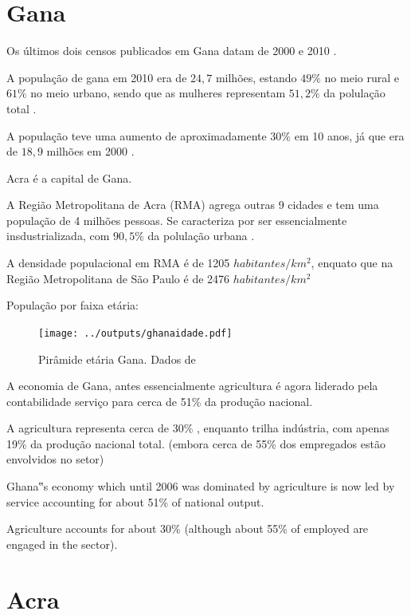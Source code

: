 \section{Gana}

Os últimos dois censos publicados em Gana datam
de 2000 \cite{censu2003} e 2010 \cite{censu2013}.

A população de gana em 2010 era de $24,7$ milhões, 
estando $49\%$ no meio rural e $61\%$ no meio urbano, 
sendo que as mulheres representam $51,2\%$ da polulação
total \cite{censu2013}.  

A população teve uma aumento de aproximadamente 
$30\%$ em 10 anos, já que era de $18,9$ milhões 
em 2000 \cite{censu2003}.

Acra é a capital de Gana. 

A Região Metropolitana de Acra (RMA) agrega outras 9 cidades
e tem uma população de 4 milhões pessoas. Se caracteriza por 
ser essencialmente insdustrializada, com $90,5 \%$ 
da polulação urbana \cite{censu2013}.  

A densidade populacional em RMA é de 1205 $habitantes/km^2$, 
enquato que na Região Metropolitana de São Paulo é de 
2476 $habitantes/km^2$ \cite{ibge2011}

População por faixa etária:  

\begin{figure}[H]
\begin{center}
  \texttt{[image: ../outputs/ghanaidade.pdf]}
  \caption{Pirâmide etária Gana. Dados de \cite{censu2013}}
\end{center}
\end{figure}

A economia de Gana, antes essencialmente agricultura é agora liderado pela contabilidade serviço para cerca de 51\% da produção nacional. 

A agricultura representa cerca de 30\% , enquanto trilha indústria, com apenas 19\% da produção nacional total. (embora cerca de 55\% dos empregados estão envolvidos no setor)

Ghana‟s economy which until 2006 was dominated by agriculture is now led by service accounting for about 51\% of national output. 

Agriculture accounts for about 30\% (although about 55\% of employed are engaged in the sector).



\section{Acra}

